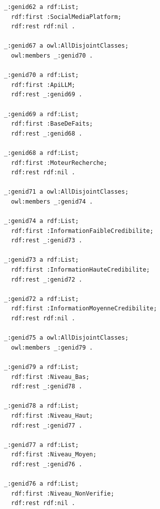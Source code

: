 \documentclass[9pt,twocolumn,french]{article}
\begin{document}
\begin{lstlisting}[language=Turtle,basicstyle=\ttfamily\tiny,frame=single]
_:genid62 a rdf:List;
  rdf:first :SocialMediaPlatform;
  rdf:rest rdf:nil .

_:genid67 a owl:AllDisjointClasses;
  owl:members _:genid70 .

_:genid70 a rdf:List;
  rdf:first :ApiLLM;
  rdf:rest _:genid69 .

_:genid69 a rdf:List;
  rdf:first :BaseDeFaits;
  rdf:rest _:genid68 .

_:genid68 a rdf:List;
  rdf:first :MoteurRecherche;
  rdf:rest rdf:nil .

_:genid71 a owl:AllDisjointClasses;
  owl:members _:genid74 .

_:genid74 a rdf:List;
  rdf:first :InformationFaibleCredibilite;
  rdf:rest _:genid73 .

_:genid73 a rdf:List;
  rdf:first :InformationHauteCredibilite;
  rdf:rest _:genid72 .

_:genid72 a rdf:List;
  rdf:first :InformationMoyenneCredibilite;
  rdf:rest rdf:nil .

_:genid75 a owl:AllDisjointClasses;
  owl:members _:genid79 .

_:genid79 a rdf:List;
  rdf:first :Niveau_Bas;
  rdf:rest _:genid78 .

_:genid78 a rdf:List;
  rdf:first :Niveau_Haut;
  rdf:rest _:genid77 .

_:genid77 a rdf:List;
  rdf:first :Niveau_Moyen;
  rdf:rest _:genid76 .

_:genid76 a rdf:List;
  rdf:first :Niveau_NonVerifie;
  rdf:rest rdf:nil .

\end{lstlisting}
\end{document}
